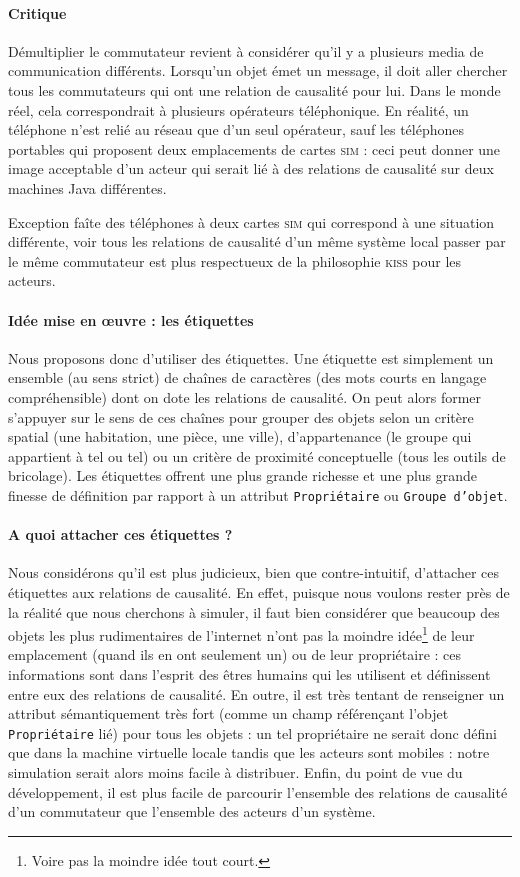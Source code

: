 \documentclass[11pt]{article}
\begin{document}
\paragraph{Critique} Démultiplier le commutateur revient à considérer qu'il y a plusieurs media de communication différents. Lorsqu'un objet émet un message, il doit aller chercher tous les commutateurs qui ont une relation de causalité pour lui. Dans le monde réel, cela correspondrait à plusieurs opérateurs téléphonique. En réalité, un téléphone n'est relié au réseau que d'un seul opérateur, 
sauf les téléphones portables qui proposent deux emplacements de cartes \textsc{sim} : ceci peut donner une image acceptable d'un acteur qui serait lié à des relations de causalité sur deux machines Java différentes. 

Exception faîte des téléphones à deux cartes \textsc{sim} qui correspond à une situation différente, voir tous les relations de causalité d'un même système local passer par le même commutateur est plus respectueux de la philosophie \textsc{kiss} pour les acteurs.

\paragraph{Idée mise en œuvre : les étiquettes} Nous proposons donc d'utiliser des étiquettes. Une étiquette est simplement un ensemble (au sens strict) de chaînes de caractères (des mots courts en langage compréhensible) dont on dote les relations de causalité. On peut alors former s'appuyer sur le sens de ces chaînes pour grouper des objets selon un critère spatial (une habitation, une pièce, une ville), d'appartenance (le groupe qui appartient à tel ou tel) ou un critère de proximité conceptuelle (tous les outils de bricolage). Les étiquettes offrent une plus grande richesse et une plus grande finesse de définition par rapport à un attribut \texttt{Propriétaire} ou \texttt{Groupe d'objet}.

\paragraph{A quoi attacher ces étiquettes ?} Nous considérons qu'il est plus judicieux, bien que contre-intuitif, d'attacher ces étiquettes aux relations de causalité. En effet, puisque nous voulons rester près de la réalité que nous cherchons à simuler, il faut bien considérer que beaucoup des objets les plus rudimentaires de l'internet n'ont pas la moindre idée\footnote{Voire pas la moindre idée tout court.} de leur emplacement (quand ils en ont seulement un) ou de leur propriétaire : ces informations sont dans l'esprit des êtres humains qui les utilisent et définissent entre eux des relations de causalité. En outre, il est très tentant de renseigner un attribut sémantiquement très fort (comme un champ référençant l'objet \texttt{Propriétaire} lié) pour tous les objets : un tel propriétaire ne serait donc défini que dans la machine virtuelle locale tandis que les acteurs sont mobiles : notre simulation serait alors moins facile à distribuer. Enfin, du point de vue du développement, il est plus facile de parcourir l'ensemble des relations de causalité d'un commutateur que l'ensemble des acteurs d'un système.
\end{document}
